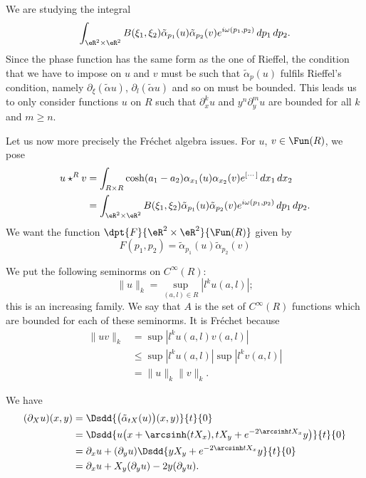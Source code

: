 We are studying the integral
\[
	\int_{\eR^2\times\eR^2} B(\xi_1,\xi_2)\tilde\alpha_{p_1}(u)\tilde\alpha_{p_2}(v)e^{i\omega(p_1,p_2)}\,dp_1\,dp_2.
\]
Since the phase function has the same form as the one of Rieffel, the condition that we have to impose on $u$ and $v$ must be such that $\tilde\alpha_p(u)$ fulfils Rieffel's condition, namely $\partial_{\xi}(\tilde\alpha u)$, $\partial_l(\tilde\alpha u)$ and so on must be bounded. This leads us to only consider functions $u$ on $R$ such that $\partial_x^ku$ and $y^n\partial^m_yu$ are bounded for all $k$ and $m\geq n$.


Let us now more precisely the Fréchet algebra issues. For $u$, $v\in\Fun(R)$, we pose
\[
	\begin{aligned}
		u\star^R v & =\int_{R\times R} \cosh(a_1-a_2)\alpha_{x_1}(u)\alpha_{x_2}(v)e^{[\cdots]}\,dx_1\,dx_2                            \\
		           & =\int_{\eR^2\times\eR^2}B(\xi_1,\xi_2)\tilde\alpha_{p_1}(u)\tilde\alpha_{p_2}(v)e^{i\omega(p_1,p_2)}\,dp_1\,dp_2.
	\end{aligned}
\]
We want the function $\dpt{ F }{ \eR^2\times\eR\sp 2 }{ \Fun(R) }$ given by
\[
	F(p_1,p_2)=\tilde\alpha_{p_1}(u)\tilde\alpha_{p_2}(v)
\]

We put the following seminorms on $ C^{\infty}(R)$:
\begin{equation}
	\| u \|_k=\sup_{(a,l)\in R}| l^ku(a,l) |;
\end{equation}
this is an increasing family. We say that $A$ is the set of $ C^{\infty}(R)$ functions which are bounded for each of these seminorms. It is Fréchet because
\[
	\begin{split}
		\| uv \|_k&=\sup | l^ku(a,l)v(a,l) |\\
		&\leq \sup| l^ku(a,l) |\sup| l^kv(a,l) |\\
		&=\| u \|_k\| v \|_k.
	\end{split}
\]

We have
\begin{equation}
	\begin{split}
		(\partial_X u)(x,y)&=\Dsdd{ \big( \tilde\alpha_{tX}(u) \big)(x,y) }{t}{0}\\
		&=\Dsdd{ u\big( x+\arcsinh(tX_x), tX_y+e^{-2\arcsinh tX_x}y \big) }{t}{0}\\
		&=\partial_x u+(\partial_yu)\Dsdd{ yX_y+e^{-2\arcsinh tX_x}y }{t}{0}\\
		&=\partial_xu+X_y(\partial_yu)-2 y(\partial_yu).
	\end{split}
\end{equation}

